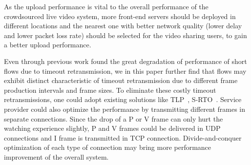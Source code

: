 As the upload performance is vital to the overall performance of the crowdsourced live video system, more front-end servers should be deployed in different locations and the nearest one with better network quality (\ie lower delay and lower packet loss rate) should be selected for the video sharing users, to gain a better upload performance.

Even through previous work \cite{flach2013reducing,zhou2015demystifying} found the great degradation of performance of short flows due to timeout retransmission, we in this paper further find that flows may exhibit distinct characteristic of timeout retransmission due to different frame production intervals and frame sizes. To eliminate these costly timeout retransmissions, one could adopt existing solutions like TLP~\cite{flach2013reducing}, S-RTO~\cite{zhou2015demystifying}. Service provider could also optimize the performance by transmitting different frames in separate connections. Since the drop of a P or V frame can only hurt the watching experience slightly, P and V frames could be delivered in UDP connections and I frame is transmitted in TCP connection. Divide-and-conquer optimization of each type of connection may bring more performance improvement of the overall system.